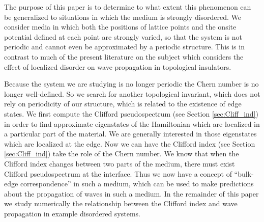 \documentclass[a4paper]{article}
\newcommand{\aw}[1]{{\color{blue} [AW: #1]}}
\begin{document}
The purpose of this paper is to determine to what extent this phenomenon can be generalized to situations in which the medium is strongly disordered. We consider media in which both the positions of lattice points and the onsite potential defined at each point are strongly varied, so that the system is not periodic and cannot even be approximated by a periodic structure. This is in contrast to much of the present literature on the subject which considers the effect of localized disorder on wave propagation in topological insulators. 

Because the system we are studying is no longer periodic the Chern number is no longer well-defined. So we search for another topological invariant, which does not rely on periodicity of our structure, which is related to the existence of edge states. We first compute the Clifford pseudospectrum (see Section \ref{sec:Cliff_ind}) in order to find approximate eigenstates of the Hamiltonian which are localized in a particular part of the material. We are generally interested in those eigenstates which are localized at the edge. Now we can have the Clifford index (see Section \ref{sec:Cliff_ind}) take the role of the Chern number. We know that when the Clifford index changes between two parts of the medium, there must exist Clifford pseudospectrum at the interface. Thus we now have a concept of ``bulk-edge correspondence'' in such a medium, which can be used to make predictions about the propagation of waves in such a medium. In the remainder of this paper we study numerically the relationship between the Clifford index and wave propagation in example disordered systems.

\end{document}
